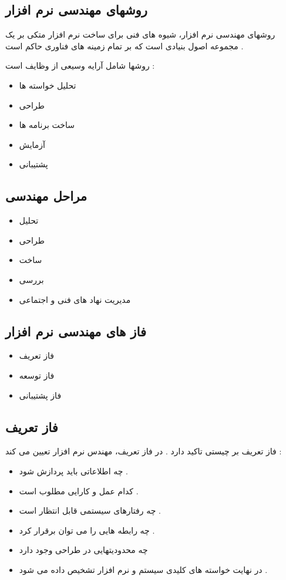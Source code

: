 \documentclass{article}
\begin{document}
\subsection{روشهای مهندسی نرم افزار}
روشهای مهندسی نرم افزار، شیوه های فنی برای ساخت نرم افزار متکی بر یک مجموعه اصول بنیادی است که بر تمام زمینه های فناوری حاکم است .

روشها شامل آرایه وسیعی از وظایف است :

\begin{itemize}
	\item تحلیل خواسته ها
	\item طراحی
	\item ساخت برنامه ها
	\item آزمایش
	\item پشتیبانی
\end{itemize}




\subsection{مراحل مهندسی}

\begin{itemize}
	\item تحلیل
	\item طراحی
	\item ساخت
	\item بررسی
	\item مدیریت نهاد های فنی و اجتماعی
\end{itemize}




\subsection{فاز های مهندسی نرم افزار}

\begin{itemize}
	\item فاز تعریف
	\item فاز توسعه
	\item فاز پشتیبانی
\end{itemize}



\subsection{ فاز تعریف}

فاز تعریف بر چیستی تاکید دارد . در فاز تعریف، مهندس نرم افزار تعیین می کند :

\begin{itemize}
	\item  چه اطلاعاتی باید پردازش شود .
	\item کدام عمل و کارایی مطلوب است .
	\item چه رفتارهای سیستمی قابل انتظار است .
	\item چه رابطه هایی را می توان برقرار کرد .
	\item چه محدودیتهایی در طراحی وجود دارد
	\item در نهایت خواسته های کلیدی سیستم و نرم افزار تشخیص داده می شود .
\end{itemize}
\end{document}
